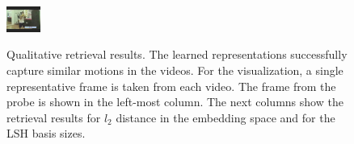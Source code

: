 \begin{figure}[t]
\begin{center}
\begin{tabu}
            \includegraphics[width=0.1\textwidth]{images/ret_results/2/16.png} \\ \hline            
        \end{tabu}
        \caption{Qualitative retrieval results. The learned representations successfully capture similar motions in the videos. For the visualization, a single representative frame is taken from each video. The frame from the probe is shown in the left-most column. The next columns show the retrieval results for $l_2$ distance in the embedding space and for the LSH basis sizes.  }
        \label{fig:retres}
    \end{center}
\end{figure}



